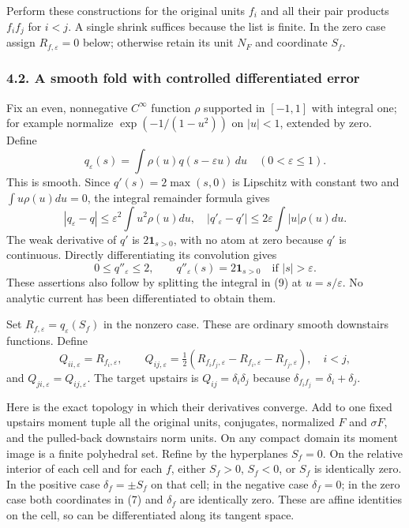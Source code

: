 \documentclass[
  11pt,
]{article}
\begin{document}
Perform these constructions for the original units \(f_i\) and all their
pair products \(f_if_j\) for \(i<j\). A single shrink suffices because
the list is finite. In the zero case assign \(R_{f,\varepsilon}=0\)
below; otherwise retain its unit \(N_F\) and coordinate \(S_f\).

\subsubsection{4.2. A smooth fold with controlled differentiated
error}\label{a-smooth-fold-with-controlled-differentiated-error}

Fix an even, nonnegative \(C^\infty\) function \(\rho\) supported in
\([-1,1]\) with integral one; for example normalize \(\exp(-1/(1-u^2))\)
on \(|u|<1\), extended by zero. Define \[
 q_\varepsilon(s)=\int\rho(u)q(s-\varepsilon u)\,du
 \quad(0<\varepsilon\leq1).                               \tag{9}
\] This is smooth. Since \(q'(s)=2\max(s,0)\) is Lipschitz with constant
two and \(\int u\rho(u)du=0\), the integral remainder formula gives \[
 |q_\varepsilon-q|\leq\varepsilon^2\int u^2\rho(u)du,
 \quad |q'_\varepsilon-q'|\leq2\varepsilon\int|u|\rho(u)du.
                                                                    \tag{10}
\] The weak derivative of \(q'\) is \(2\mathbf1_{s>0}\), with no atom at
zero because \(q'\) is continuous. Directly differentiating its
convolution gives \[
 0\leq q''_\varepsilon\leq2,\qquad
 q''_\varepsilon(s)=2\mathbf1_{s>0}\quad\text{if }|s|>\varepsilon.
                                                                    \tag{11}
\] These assertions also follow by splitting the integral in (9) at
\(u=s/\varepsilon\). No analytic current has been differentiated to
obtain them.

Set \(R_{f,\varepsilon}=q_\varepsilon(S_f)\) in the nonzero case. These
are ordinary smooth downstairs functions. Define \[
 Q_{ii,\varepsilon}=R_{f_i,\varepsilon},\qquad
 Q_{ij,\varepsilon}
  =\tfrac12(R_{f_if_j,\varepsilon}
                   -R_{f_i,\varepsilon}-R_{f_j,\varepsilon}),\quad i<j,
                                                                    \tag{12}
\] and \(Q_{ji,\varepsilon}=Q_{ij,\varepsilon}\). The target upstairs is
\(Q_{ij}=\delta_i\delta_j\) because
\(\delta_{f_if_j}=\delta_i+\delta_j\).

Here is the exact topology in which their derivatives converge. Add to
one fixed upstairs moment tuple all the original units, conjugates,
normalized \(F\) and \(\sigma F\), and the pulled-back downstairs norm
units. On any compact domain its moment image is a finite polyhedral
set. Refine by the hyperplanes \(S_f=0\). On the relative interior of
each cell and for each \(f\), either \(S_f>0\), \(S_f<0\), or \(S_f\) is
identically zero. In the positive case \(\delta_f=\pm S_f\) on that
cell; in the negative case \(\delta_f=0\); in the zero case both
coordinates in (7) and \(\delta_f\) are identically zero. These are
affine identities on the cell, so can be differentiated along its
tangent space.
\end{document}
